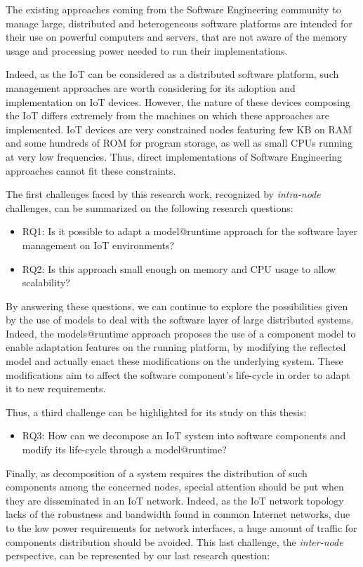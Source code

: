 The existing approaches coming from the Software Engineering community to manage large, distributed and heterogeneous software platforms are intended for their use on powerful computers and servers, that are not aware of the memory usage and processing power needed to run their implementations.

Indeed, as the IoT can be considered as a distributed software platform, such management approaches are worth considering for its adoption and implementation on IoT devices.
However, the nature of these devices composing the IoT differs extremely from the machines on which these approaches are implemented.
IoT devices are very constrained nodes featuring few KB on RAM and some hundreds of ROM for program storage, as well as small CPUs running at very low frequencies.
Thus, direct implementations of Software Engineering approaches cannot fit these constraints.

The first challenges faced by this research work, recognized by \textit{intra-node} challenges, can be summarized on the following research questions:

\begin{itemize}
	\item RQ1: Is it possible to adapt a model@runtime approach for the software layer management on IoT environments?
	\item RQ2: Is this approach small enough on memory and CPU usage to allow scalability?
\end{itemize}

By answering these questions, we can continue to explore the possibilities given by the use of models to deal with the software layer of large distributed systems.
Indeed, the models@runtime approach proposes the use of a component model to enable adaptation features on the running platform, by modifying the reflected model and actually enact these modifications on the underlying system.
These modifications aim to affect the software component's life-cycle in order to adapt it to new requirements.

Thus, a third challenge can be highlighted for its study on this thesis:

\begin{itemize}
	\item RQ3: How can we decompose an IoT system into software components and modify its life-cycle through a model@runtime?
\end{itemize}

Finally, as decomposition of a system requires the distribution of such components among the concerned nodes, special attention should be put when they are disseminated in an IoT network.
Indeed, as the IoT network topology lacks of the robustness and bandwidth found in common Internet networks, due to the low power requirements for network interfaces, a huge amount of traffic for components distribution should be avoided.
This last challenge, the \textit{inter-node} perspective, can be represented by our last research question:

